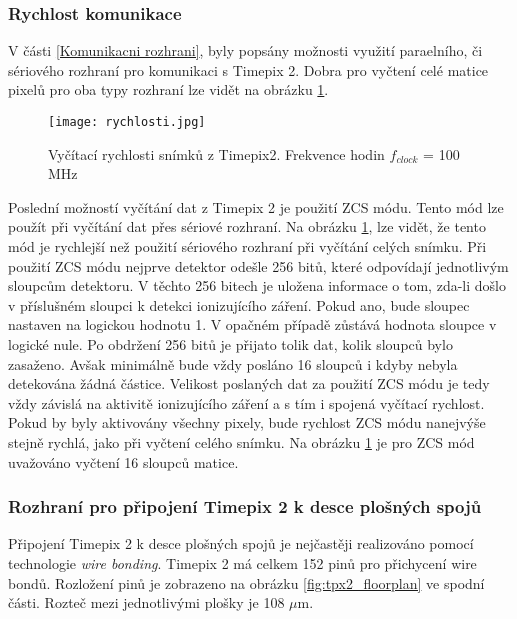 \subsubsection{Rychlost komunikace}
V části \ref{Komunikacni rozhrani}, byly popsány možnosti využití paraelního, či sériového rozhraní pro komunikaci s Timepix 2. Dobra pro vyčtení celé matice pixelů pro oba typy rozhraní lze vidět na obrázku \ref{fig:rychlosti}. 
\begin{figure}[h!]
	\centering
	\captionsetup{justification=centering}
	\texttt{[image: rychlosti.jpg]}
	\caption{Vyčítací rychlosti snímků z Timepix2. Frekvence hodin $f_{clock}$ = 100 MHz \cite{Timepix2}} 
	\label{fig:rychlosti}
\end{figure}	

Poslední možností vyčítání dat z Timepix 2 je použití ZCS módu. Tento mód lze použít při vyčítání dat přes sériové rozhraní. Na obrázku \ref{fig:rychlosti}, lze vidět, že tento mód je rychlejší než použití sériového rozhraní při vyčítání celých snímku. Při použití ZCS módu nejprve detektor odešle 256 bitů, které odpovídají jednotlivým sloupcům detektoru. V těchto 256 bitech je uložena informace o tom, zda-li došlo v příslušném sloupci k detekci ionizujícího záření. Pokud ano, bude sloupec nastaven na logickou hodnotu 1. V opačném případě zůstává hodnota sloupce v logické nule. Po obdržení 256 bitů je přijato tolik dat, kolik sloupců bylo zasaženo. Avšak minimálně bude vždy posláno 16 sloupců i kdyby nebyla detekována žádná částice. Velikost poslaných dat za použití ZCS módu je tedy vždy závislá na aktivitě ionizujícího záření a s tím i spojená vyčítací rychlost. Pokud by byly aktivovány všechny pixely, bude rychlost ZCS módu nanejvýše stejně rychlá, jako při vyčtení celého snímku. Na obrázku \ref{fig:rychlosti} je pro ZCS mód uvažováno vyčtení 16 sloupců matice.



\subsubsection{Rozhraní pro připojení Timepix 2 k desce plošných spojů}	%
Připojení Timepix 2 k desce plošných spojů je nejčastěji realizováno pomocí technologie \textit{wire bonding}. Timepix 2 má celkem 152 pinů pro přichycení wire bondů. Rozložení pinů je zobrazeno na obrázku \ref{fig:tpx2_floorplan} ve spodní části. Rozteč mezi jednotlivými plošky je 108 $\mu$m.

